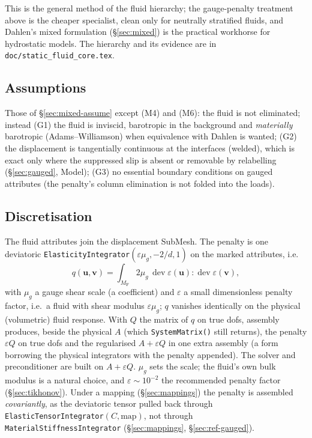 \documentclass[11pt]{article}
\numberwithin{equation}{section}
\theoremstyle{remark}
\newcommand{\eps}{\varepsilon}
\newcommand{\dev}{\operatorname{dev}}
\newcommand{\vu}{\mathbf{u}}
\newcommand{\vv}{\mathbf{v}}
\newcommand{\MF}{M_{\mathrm{F}}}
\newcommand{\code}[1]{\texttt{#1}}
\begin{document}
This is the general method of the fluid hierarchy; the gauge-penalty
treatment above is the cheaper specialist, clean only for neutrally
stratified fluids, and Dahlen's mixed formulation
(\S\ref{sec:mixed}) is the practical workhorse for hydrostatic models.
The hierarchy and its evidence are in \code{doc/static\_fluid\_core.tex}.

\subsection{Assumptions}

Those of \S\ref{sec:mixed-assume} except (M4) and (M6): the fluid is not
eliminated; instead (G1) the fluid is inviscid, barotropic in the
background and \emph{materially} barotropic (Adams--Williamson) when
equivalence with Dahlen is wanted; (G2) the displacement is tangentially continuous at the
interfaces (welded), which is exact only where the suppressed slip is
absent or removable by relabelling (\S\ref{sec:gauged}, Model);
(G3) no essential boundary conditions on gauged attributes (the penalty's
column elimination is not folded into the loads).

\subsection{Discretisation}

The fluid attributes join the displacement SubMesh. The penalty is one
deviatoric \code{ElasticityIntegrator}$(\eps\mu_g, -2/d, 1)$ on the marked
attributes, i.e.\
\begin{equation}
  q(\vu,\vv) = \int_{\MF} 2\mu_g\,\dev\eps(\vu):\dev\eps(\vv),
\end{equation}
with $\mu_g$ a gauge shear scale (a coefficient) and $\eps$ a small
dimensionless penalty factor, i.e.\ a fluid with shear modulus $\eps\mu_g$;
$q$ vanishes identically on the physical (volumetric) fluid response.
With $Q$ the matrix of $q$ on true dofs, assembly produces, beside the physical $A$ (which \code{SystemMatrix()}
still returns), the penalty $\eps Q$ on true dofs and the regularised
$A + \eps Q$ in one extra assembly (a form borrowing the physical
integrators with the penalty appended). The solver and preconditioner are
built on $A+\eps Q$. $\mu_g$ sets the scale; the fluid's own bulk modulus
is a natural choice, and $\eps\sim10^{-2}$ the recommended penalty factor
(\S\ref{sec:tikhonov}). Under a mapping (\S\ref{sec:mappings}) the
penalty is assembled \emph{covariantly}, as the deviatoric tensor pulled
back through \code{ElasticTensorIntegrator}$(C,\text{map})$, not through
\code{MaterialStiffnessIntegrator} (\S\ref{sec:mappings},
\S\ref{sec:ref-gauged}).
\end{document}
